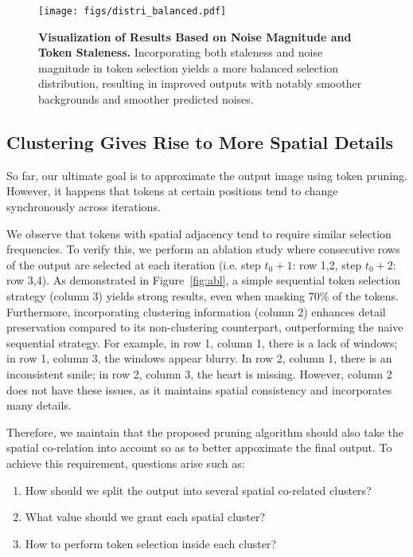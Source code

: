 \documentclass[10pt]{article}
\begin{document}
\begin{figure}[htbp]
    \centering
    \texttt{[image: figs/distri\_balanced.pdf]}
    \caption{\textbf{Visualization of Results Based on Noise Magnitude and Token Staleness.} Incorporating both staleness and noise magnitude in token selection yields a more balanced selection distribution, resulting in improved outputs with notably smoother backgrounds and smoother predicted noises.}
    \label{fig:distri_aware}
\end{figure}


\subsection{Clustering Gives Rise to More Spatial Details}
\label{sec::cluster}



So far, our ultimate goal is to approximate the output image using token pruning. However, it happens that tokens at certain positions tend to change synchronously across iterations. 


We observe that tokens with spatial adjacency tend to require similar selection frequencies. To verify this, we perform an ablation study where consecutive rows of the output are selected at each iteration (i.e. step $t_0+1$: row 1,2, step $t_0+2$: row 3,4). As demonstrated in Figure~\ref{fig:abl}, a simple sequential token selection strategy (column 3) yields strong results, even when masking 70\% of the tokens. Furthermore, incorporating clustering information (column 2) enhances detail preservation compared to its non-clustering counterpart, outperforming the naive sequential strategy. For example, in row 1, column 1, there is a lack of windows; in row 1, column 3, the windows appear blurry. In row 2, column 1, there is an inconsistent smile; in row 2, column 3, the heart is missing. However, column 2 does not have these issues, as it maintains spatial consistency and incorporates many details.




Therefore, we maintain that the proposed pruning algorithm should also take the spatial co-relation into account so as to better appoximate the final output. To achieve this requirement, questions arise such as:
\begin{enumerate}
    \item How should we split the output into several spatial co-related clusters?
    \item What value should we grant each spatial cluster?
    \item How to perform token selection inside each cluster?
\end{enumerate}
\end{document}
